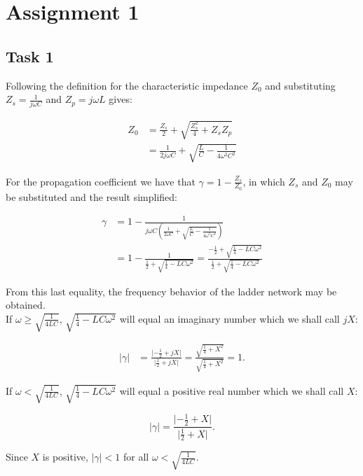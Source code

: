 \documentclass[11pt,titlepage]{report}
\begin{document}
\chapter{Assignment 1}
\section{Task 1}

Following the definition for the characteristic impedance $Z_0$ and substituting $Z_s=\frac{1}{j\omega C}$ and $Z_p=j\omega L$ gives:

\begin{align}
	Z_0 &=\frac{Z_s}{2} + \sqrt{\frac{Z_s^2}{4}+Z_sZ_p} \nonumber \\
	&= \frac{1}{2j\omega C} + \sqrt{\frac{L}{C}-\frac{1}{4\omega^2C^2}} 
\end{align}

For the propagation coefficient we have that $\gamma = 1-\frac{Z_s}{Z_0}$, in which $Z_s$ and $Z_0$ may be substituted and the result simplified:

\begin{align}
	\gamma &= 1 - \frac{1}{ j\omega C\left( \frac{1}{2\omega C} + \sqrt{\frac{L}{C}-\frac{1}{4\omega^2C^2}}\right)}
	\\
	&= 1 - \frac{1}{\frac{1}{2}+\sqrt{\frac{1}{4}-LC\omega^2}} = \frac{-\frac{1}{2}+\sqrt{\frac{1}{4}-LC\omega^2}}{\frac{1}{2}+\sqrt{\frac{1}{4}-LC\omega^2}}
\end{align}

From this last equality, the frequency behavior of the ladder network may be obtained.
\\
If $\omega\geq\sqrt{\frac{1}{4LC}}$, $\sqrt{\frac{1}{4}-LC\omega^2}$ will equal an imaginary number which we shall call $jX$:

\begin{align}
	\lvert\gamma\rvert &= \frac{\lvert -\frac{1}{2}+jX \rvert}{\lvert \frac{1}{2}+jX \rvert} = 
	\frac{\sqrt{\frac{1}{4}+X^2}}{\sqrt{\frac{1}{4}+X^2}}=1.
\end{align}

If $\omega < \sqrt{\frac{1}{4LC}}$, $\sqrt{\frac{1}{4}-LC\omega^2}$ will equal a positive real number which we shall call $X$:

\begin{equation}
	\lvert\gamma\rvert = \frac{\lvert -\frac{1}{2}+X \rvert}{\lvert \frac{1}{2}+X \rvert}.
\end{equation}

Since $X$ is positive, $\lvert\gamma\rvert < 1$ for all $\omega < \sqrt{\frac{1}{4LC}}$. 
\end{document}
